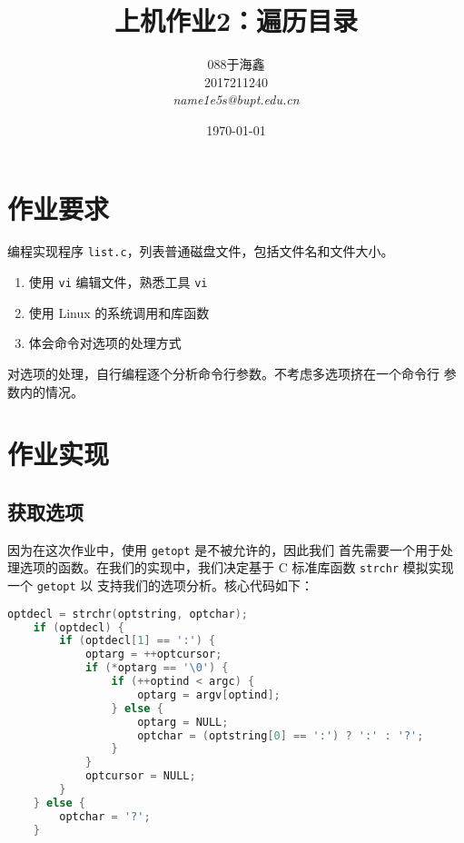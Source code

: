 \documentclass[blue,normal,cn]{elegantnote}
\title{上机作业2：遍历目录}
\date{\today}
\newcommand{\code}[1]{\colorbox{light-gray}{\texttt{#1}}}
\begin{document}
\author{
	\begin{tabular}[t]{c}
		088于海鑫  \\
		2017211240 \\
		\emph{name1e5s@bupt.edu.cn}
	\end{tabular}
}
\maketitle

\tableofcontents

\section{作业要求}

编程实现程序 \code{list.c}，列表普通磁盘文件，包括文件名和文件大小。

\begin{enumerate}
	\item 使用 \code{vi} 编辑文件，熟悉工具 \code{vi}
	\item 使用 Linux 的系统调用和库函数
	\item 体会命令对选项的处理方式
\end{enumerate}

对选项的处理，自行编程逐个分析命令行参数。不考虑多选项挤在一个命令行
参数内的情况。

\section{作业实现}

\subsection{获取选项}

因为在这次作业中，使用 \code{getopt} 是不被允许的，因此我们
首先需要一个用于处理选项的函数。在我们的实现中，我们决定基于
C 标准库函数 \code{strchr} 模拟实现一个 \code{getopt} 以
支持我们的选项分析。核心代码如下：

\begin{lstlisting}[language=C]
    optdecl = strchr(optstring, optchar);
    if (optdecl) {
        if (optdecl[1] == ':') {
            optarg = ++optcursor;
            if (*optarg == '\0') {
                if (++optind < argc) {
                    optarg = argv[optind];
                } else {
                    optarg = NULL;
                    optchar = (optstring[0] == ':') ? ':' : '?';
                }
            }
            optcursor = NULL;
        }
    } else {
        optchar = '?';
    }
\end{lstlisting}
\end{document}
